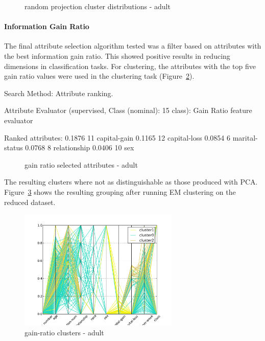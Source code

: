 \documentclass{sig-alternate}
\begin{document}
\begin{figure}[!htbp]
    \centering
    \theverbbox
    \caption{random projection cluster distributions - adult\label{rp-custer-dist-adult}}
\end{figure}


\paragraph{Information Gain Ratio}

The final attribute selection algorithm tested was a filter based on attributes with the best information gain ratio. This showed positive results in reducing dimensions in classification tasks. For clustering, the attributes with the top five gain ratio values were used in the clustering task (Figure~\ref{gain-adult}).

\begin{verbbox}
Search Method:
    Attribute ranking.

Attribute Evaluator (supervised, Class (nominal): 15 class):
    Gain Ratio feature evaluator

Ranked attributes:
 0.1876  11 capital-gain
 0.1165  12 capital-loss
 0.0854   6 marital-status
 0.0768   8 relationship
 0.0406  10 sex
\end{verbbox}
\normalsize

\begin{figure}[!htbp]
    \centering
    \theverbbox
    \caption{gain ratio selected attributes - adult\label{gain-adult}}
\end{figure}


The resulting clusters where not as distinguishable as those produced with PCA. Figure~\ref{parallel-gain-cluster} shows the resulting grouping after running EM clustering on the reduced dataset.

\begin{figure}[!htbp]
    \centering
    \includegraphics[width=3in]{part2/adult/parallel-gain-cluster.pdf}
    \caption{gain-ratio clusters - adult\label{parallel-gain-cluster}}
\end{figure} 
\end{document}
